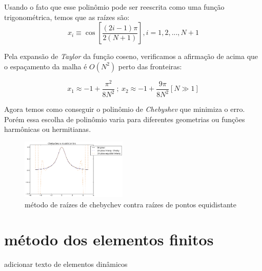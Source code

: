  Usando o fato que esse polinômio pode ser reescrita como uma função trigonométrica, temos que as raízes são:
 \begin{equation}
  x_i  \equiv \cos \left [ \frac{(2i - 1)\pi}{2(N+1)}  \right ] , i = 1,2,..., N+1
 \end{equation}
 
 Pela expansão de \emph{Taylor} da função coseno, verificamos a afirmação de acima que o espaçamento da malha é $O(N^2)$ perto das fronteiras:
 
 \begin{equation}
  x_1 \approx -1 + \frac{\pi^2}{8N^2}\ ;\ x_2 \approx -1 + \frac{9\pi}{8N^2} [N\gg 1]
 \end{equation}
 
 Agora temos como conseguir o polinômio de \emph{Chebyshev} que minimiza o erro. Porém essa escolha de polinômio varia para diferentes geometrias ou funções harmônicas ou hermitianas.
 \begin{figure}[b]
 \includegraphics[width=0.45\textwidth, center]{figuras/chebychev_equidist.png}
 \caption{método de raízes de chebychev contra raízes de pontos equidistante}
 \end{figure}
\pagebreak
\section{método dos elementos finitos}
adicionar texto de elementos dinâmicos